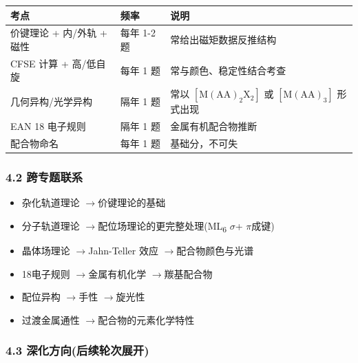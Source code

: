 \documentclass[a4paper,11pt]{ctexart}
\providecommand{\tightlist}{\setlength{\itemsep}{0pt}\setlength{\parskip}{0pt}}
\newcounter{none}
\newcommand{\箭}{\ensuremath{\rightarrow}}
\newcommand{\左箭}{\ensuremath{\leftarrow}}
\newcommand{\上箭}{\ensuremath{\uparrow}}
\newcommand{\下箭}{\ensuremath{\downarrow}}
\newcommand{\衡}{\ensuremath{\rightleftharpoons}}
\newcommand{\双箭}{\ensuremath{\leftrightarrow}}
\newcommand{\约等于}{\ensuremath{\approx}}
\newcommand{\小于等于}{\ensuremath{\leq}}
\newcommand{\大于等于}{\ensuremath{\geq}}
\newcommand{\不等于}{\ensuremath{\neq}}
\newcommand{\西格马}{\ensuremath{\sigma}}
\newcommand{\派}{\ensuremath{\pi}}
\begin{document}
{\def\LTcaptype{none} %
\begin{longtable}[]{@{}
  >{\raggedright\arraybackslash}p{}
  >{\centering\arraybackslash}p{}
  >{\raggedright\arraybackslash}p{}@{}}
\toprule\noalign{}
\begin{minipage}[b]{\linewidth}\raggedright
考点
\end{minipage} & \begin{minipage}[b]{\linewidth}\centering
频率
\end{minipage} & \begin{minipage}[b]{\linewidth}\raggedright
说明
\end{minipage} \\
\midrule\noalign{}
\endhead
\bottomrule\noalign{}
\endlastfoot
价键理论 + 内/外轨 + 磁性 & 每年 1-2 题 & 常给出磁矩数据反推结构 \\
CFSE 计算 + 高/低自旋 & 每年 1 题 & 常与颜色、稳定性结合考查 \\
几何异构/光学异构 & 隔年 1 题 & 常以 \([\mathrm{M(AA)_2X_2}]\) 或 \([\mathrm{M(AA)_3}]\) 形式出现 \\
EAN 18 电子规则 & 隔年 1 题 & 金属有机配合物推断 \\
配合物命名 & 每年 1 题 & 基础分，不可失 \\
\end{longtable}
}

\subsubsection{4.2 跨专题联系}\label{ux8de8ux4e13ux9898ux8054ux7cfb}

\begin{itemize}
\tightlist
\item
  杂化轨道理论 \箭 价键理论的基础
\item
  分子轨道理论 \箭 配位场理论的更完整处理(ML\textsubscript{6} \西格马 + \派 成键)
\item
  晶体场理论 \箭 Jahn-Teller 效应 \箭 配合物颜色与光谱
\item
  18电子规则 \箭 金属有机化学 \箭 羰基配合物
\item
  配位异构 \箭 手性 \箭 旋光性
\item
  过渡金属通性 \箭 配合物的元素化学特性
\end{itemize}

\subsubsection{4.3 深化方向(后续轮次展开)}\label{ux6df1ux5316ux65b9ux5411ux540eux7eedux8f6eux6b21ux5c55ux5f00}
\end{document}
